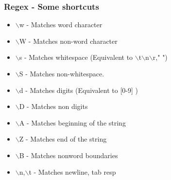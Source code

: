 \documentclass[xcolor=table,10pt]{beamer}
\begin{document}
\begin{frame}
\frametitle{Regex - Some shortcuts}
\begin{itemize}
\item $\backslash$w - Matches word character 
\item $\backslash$W - Matches non-word character
\item $\backslash$s - Matches whitespace (Equivalent to $\backslash$t$\backslash$n$\backslash$r," ")
\item $\backslash$S - Matches non-whitespace.
\item $\backslash$d - Matches digits (Equivalent to {[}0-9{]} )
\item $\backslash$D - Matches non digits
\item $\backslash$A - Matches beginning of the string
\item $\backslash$Z - Matches end of the string
\item $\backslash$B - Matches nonword boundaries
\item $\backslash$n,$\backslash$t - Matches newline, tab resp
\end{itemize}
\end{frame}




% 
\end{document}
